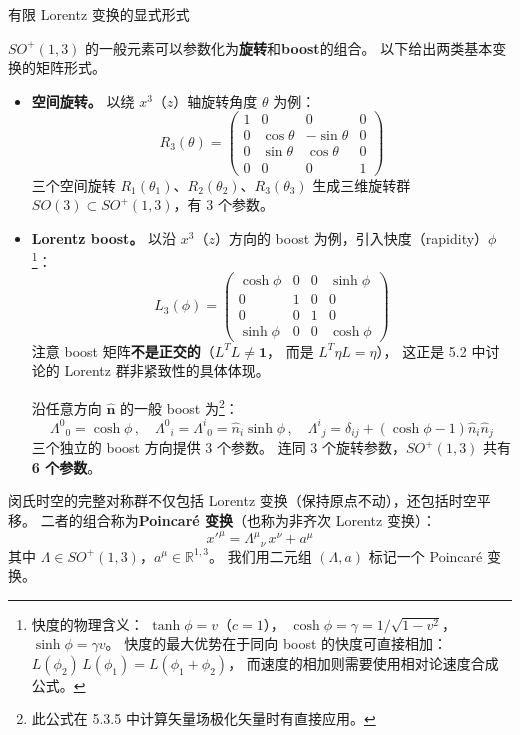 \begin{center}
  \large 有限 Lorentz 变换的显式形式
\end{center}
\vspace{2ex}
$SO^+(1,3)$ 的一般元素可以参数化为\textbf{旋转}和\textbf{boost}的组合。
以下给出两类基本变换的矩阵形式。
\begin{itemize}
  \item \textbf{空间旋转。}
    以绕 $x^3$（$z$）轴旋转角度 $\theta$ 为例：
    \begin{equation}\label{eq:rotation-z}
      R_3(\theta) =
      \begin{pmatrix}
        1 & 0 & 0 & 0\\
        0 & \cos\theta & -\sin\theta & 0\\
        0 & \sin\theta & \cos\theta & 0\\
        0 & 0 & 0 & 1
      \end{pmatrix}
    \end{equation}
    三个空间旋转 $R_1(\theta_1)$、$R_2(\theta_2)$、$R_3(\theta_3)$
    生成三维旋转群 $SO(3) \subset SO^+(1,3)$，有 3 个参数。
  \item \textbf{Lorentz boost。}
以沿 $x^3$（$z$）方向的 boost 为例，引入快度（rapidity）$\phi$\footnote{
快度的物理含义：
$\tanh\phi = v$（$c=1$），
$\cosh\phi = \gamma = 1/\sqrt{1-v^2}$，
$\sinh\phi = \gamma v$。
快度的最大优势在于同向 boost 的快度可直接相加：
$L(\phi_2)\,L(\phi_1) = L(\phi_1 + \phi_2)$，
而速度的相加则需要使用相对论速度合成公式。}：
\begin{equation}\label{eq:boost-z}
  L_3(\phi) =
  \begin{pmatrix}
    \cosh\phi & 0 & 0 & \sinh\phi\\
    0 & 1 & 0 & 0\\
    0 & 0 & 1 & 0\\
    \sinh\phi & 0 & 0 & \cosh\phi
  \end{pmatrix}
\end{equation}
注意 boost 矩阵\textbf{不是正交的}（$L^T L \neq \mathbf{1}$，
而是 $L^T\eta L = \eta$），
这正是 5.2 中讨论的 Lorentz 群非紧致性的具体体现。

沿任意方向 $\hat{\mathbf{n}}$ 的一般 boost 为\footnote{
此公式在 5.3.5 中计算矢量场极化矢量时有直接应用。}：
\begin{equation}\label{eq:general-boost}
  \Lambda^0{}_0 = \cosh\phi\,,\quad
  \Lambda^0{}_i = \Lambda^i{}_0 = \hat{n}_i\sinh\phi\,,\quad
  \Lambda^i{}_j = \delta_{ij} + (\cosh\phi - 1)\hat{n}_i\hat{n}_j
\end{equation}
三个独立的 boost 方向提供 3 个参数。
连同 3 个旋转参数，$SO^+(1,3)$ 共有 \textbf{6 个参数}。
\end{itemize}
闵氏时空的完整对称群不仅包括 Lorentz 变换（保持原点不动），还包括时空平移。
二者的组合称为\textbf{Poincar\'e 变换}（也称为非齐次 Lorentz 变换）：
\begin{equation}\label{eq:Poincare-def}
  x'^\mu = \Lambda^\mu{}_\nu\,x^\nu + a^\mu
\end{equation}
其中 $\Lambda \in SO^+(1,3)$，$a^\mu \in \mathbb{R}^{1,3}$。
我们用二元组 $(\Lambda, a)$ 标记一个 Poincar\'e 变换。


